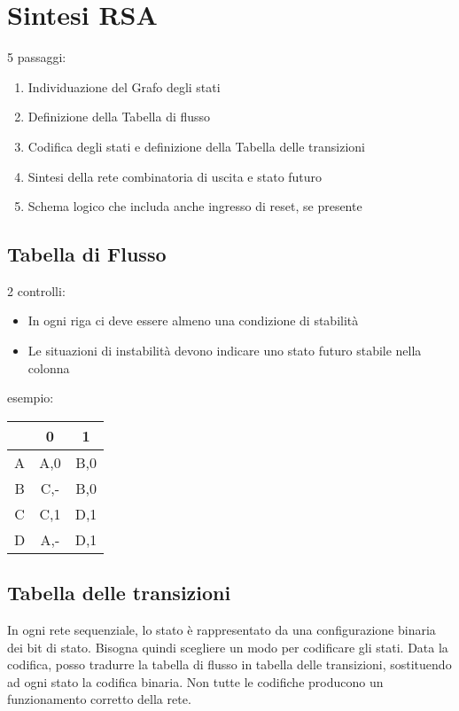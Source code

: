 \documentclass{article}
\begin{document}
\section{Sintesi RSA}

5 passaggi:

\begin{enumerate}
    \item Individuazione del Grafo degli stati
    \item Definizione della Tabella di flusso
    \item Codifica degli stati e definizione della Tabella delle transizioni
    \item Sintesi della rete combinatoria di uscita e stato futuro
    \item Schema logico che includa anche ingresso di reset, se presente
\end{enumerate}

\subsection{Tabella di Flusso}

2 controlli:

\begin{itemize}
    \item In ogni riga ci deve essere almeno una condizione di stabilità
    \item Le situazioni di instabilità devono indicare uno stato futuro stabile nella colonna
\end{itemize}

\noindent
esempio:

\begin{center}
\begin{tabular}{ |c|c|c| }
\hline
& 0 & 1 \\
\hline
\hline
A & A,0 & B,0 \\
B & C,- & B,0 \\
C & C,1 & D,1 \\
D & A,- & D,1 \\
\hline
\end{tabular}
\end{center}

\subsection{Tabella delle transizioni}

In ogni rete sequenziale, lo stato è rappresentato da una configurazione binaria dei bit di stato.
Bisogna quindi scegliere un modo per codificare gli stati.
Data la codifica, posso tradurre la tabella di flusso in tabella delle transizioni, sostituendo ad ogni stato la codifica binaria.
Non tutte le codifiche producono un funzionamento corretto della rete.\\
\end{document}
